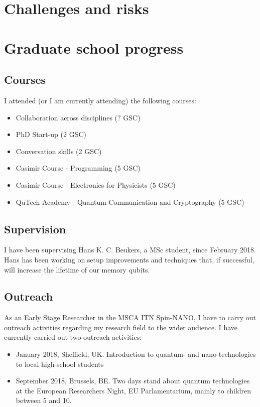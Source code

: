 \documentclass[a4paper]{article}
\begin{document}
\section{Challenges and risks}

\section{Graduate school progress}
\subsection{Courses}
I attended (or I am currently attending) the following courses:
\begin{itemize}
	\item Collaboration across disciplines (? GSC) %
	\item PhD Start-up (2 GSC)
	\item Conversation skills (2 GSC)
	\item Casimir Course - Programming (5 GSC)
	\item Casimir Course - Electronics for Physicists (5 GSC)
	\item QuTech Academy - Quantum Communication and Cryptography (5 GSC)
\end{itemize}

\subsection{Supervision}
I have been supervising Hans K. C. Beukers, a MSc student, since February 2018. Hans has been working on setup improvements and techniques that, if successful, will increase the lifetime of our memory qubits.

\subsection{Outreach}
As an Early Stage Researcher in the MSCA ITN Spin-NANO, I have to carry out outreach activities regarding my research field to the wider audience. I have currently carried out two outreach activities:
\begin{itemize}
	\item January 2018, Sheffield, UK. Introduction to quantum- and nano-technologies to local high-school students
	\item September 2018, Brussels, BE. Two days stand about quantum technologies at the European Researchers Night, EU Parlamentarium, mainly to children between 5 and 10.
\end{itemize}
\end{document}
